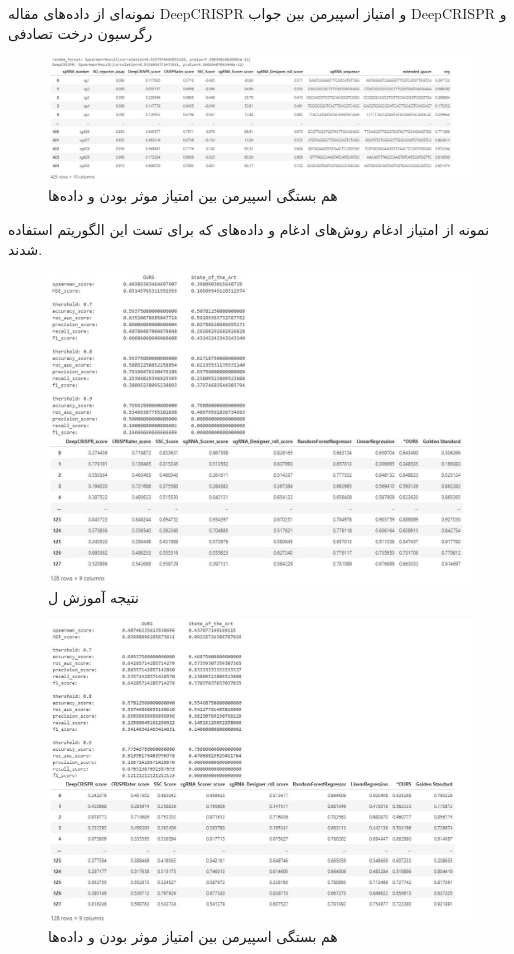 \documentclass[12pt,a4paper,BCOR=.7cm,headsepline,bibliography=totoc]{report}
\begin{document}
نمونه‌ای از داده‌های مقاله DeepCRISPR و امتیاز اسپیرمن بین جواب DeepCRISPR و رگرسیون درخت تصادفی
\begin{figure}[H]
\centering
\includegraphics[width=16cm, ]{pictures/DeepCRISPR_Data.jpg}
\caption{
هم بستگی اسپیرمن بین امتیاز موثر بودن و داده‌ها
}\label{wrap-fig:4}
\end{figure}
 نمونه از امتیاز ادغام روش‌های ادغام و داده‌های که برای تست این الگوریتم استفاده شدند.
\begin{figure}[H]
\centering
\includegraphics[width=16cm, ]{pictures/best_ensemble1.jpg}
\caption{
نتیجه آموزش ل
}\label{wrap-fig:4}
\end{figure}
\begin{figure}[H]
\centering
\includegraphics[width=16cm, ]{pictures/best_ensemble2.jpg}
\caption{
هم بستگی اسپیرمن بین امتیاز موثر بودن و داده‌ها
}\label{wrap-fig:4}
\end{figure}
\end{document}
